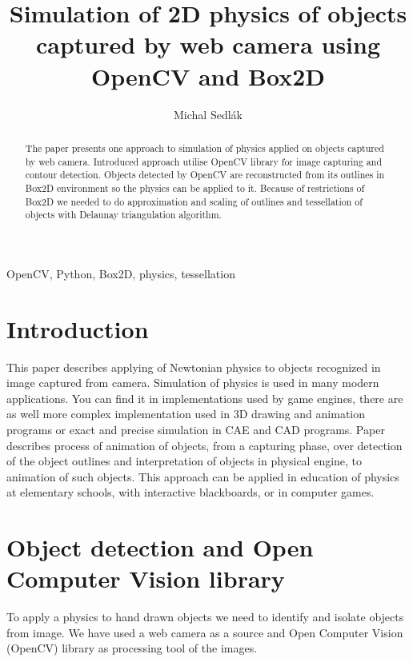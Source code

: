 \documentclass{ifacconf}
\begin{document}
\begin{frontmatter}
\title{Simulation of 2D physics of objects captured by web camera using OpenCV
and Box2D}
\author[Bratislava]{Michal Sedlák}
\address[Bratislava]{Faculty of Electrical Engineering and Information
Technology, Slovak University of Technology, Ilkovičova 3, 812 19 Bratislava,
Slovakia
\\
(e-mail: michal.sedlak@stuba.sk)}
\begin{abstract}
The paper presents one approach to simulation of physics applied on objects
captured by web camera. Introduced approach utilise OpenCV library for image
capturing and contour detection. Objects detected by OpenCV are reconstructed
from its outlines in Box2D environment so the physics can be applied to it.
Because of restrictions of Box2D we needed to do approximation and scaling of
outlines and tessellation of objects with Delaunay triangulation algorithm.
\end{abstract}
\begin{keyword}
OpenCV, Python, Box2D, physics, tessellation
\end{keyword}
\end{frontmatter}

\section{Introduction}
This paper describes applying of Newtonian physics to objects
recognized in image captured from camera. Simulation of physics is used in many
modern applications. You can find it in implementations used by game
engines, there are as well more complex implementation used in 3D drawing and
animation programs or exact and precise simulation in CAE and CAD programs.
Paper describes process of animation of objects, from a capturing
phase, over detection of the object outlines and interpretation of objects in 
physical engine, to animation of such objects. This approach can be applied in
education of physics at elementary schools, with interactive blackboards, or in
computer games.

\section{Object detection and Open Computer Vision library}
To apply a physics to hand drawn objects we need to identify and isolate
objects from image. We have used a web camera as a source and Open Computer
Vision (OpenCV) library as processing tool of the images.
\end{document}
